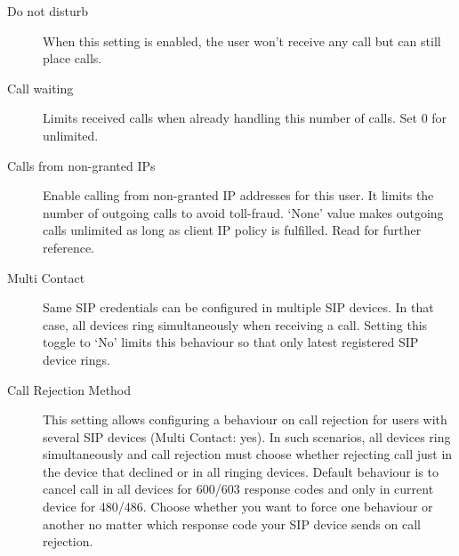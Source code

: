 \documentclass[letterpaper,10pt,english]{sphinxmanual}
\begin{document}
\begin{description}
\item[{Do not disturb}] \leavevmode{}\label{administration_portal/client/vpbx/users:term-do-not-disturb}
When this setting is enabled, the user won't receive any call but can
still place calls.

\item[{Call waiting}] \leavevmode{}\label{administration_portal/client/vpbx/users:term-call-waiting}
Limits received calls when already handling this number of calls. Set 0 for unlimited.

\item[{Calls from non-granted IPs}] \leavevmode{}\label{administration_portal/client/vpbx/users:term-calls-from-non-granted-ips}
Enable calling from non-granted IP addresses for this user.
It limits the number of outgoing calls to avoid toll-fraud.
`None' value makes outgoing calls unlimited as long as client IP
policy is fulfilled. Read {\hyperref[security_and_maintenance/security/authorized_ip_ranges:roadwarrior\string-users]{}} for further reference.

\item[{Multi Contact}] \leavevmode{}\label{administration_portal/client/vpbx/users:term-multi-contact}
Same SIP credentials can be configured in multiple SIP devices. In that case, all devices ring
simultaneously when receiving a call. Setting this toggle to `No' limits this behaviour so that
only latest registered SIP device rings.

\item[{Call Rejection Method}] \leavevmode{}\label{administration_portal/client/vpbx/users:term-call-rejection-method}
This setting allows configuring a behaviour on call rejection for users with several
SIP devices (Multi Contact: yes). In such scenarios, all devices ring simultaneously and call rejection must
choose whether rejecting call just in the device that declined or in all ringing devices.
Default behaviour is to cancel call in all devices for 600/603 response codes and only in
current device for 480/486. Choose whether you want to force one behaviour or another no
matter which response code your SIP device sends on call rejection.

\end{description}
\end{document}
